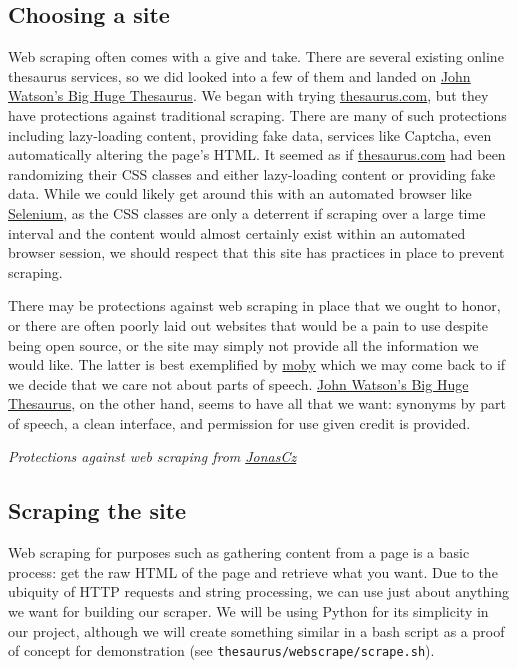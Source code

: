 \documentclass[11pt, twoside, reqno]{book}
\begin{document}
\subsection{Choosing a site}

Web scraping often comes with a give and take. There are several existing online thesaurus services, so we did looked into a few of them and landed on \href{https://words.bighugelabs.com}{John Watson's Big Huge Thesaurus}. We began with trying \href{https://www.thesaurus.com}{thesaurus.com}, but they have protections against traditional scraping. There are many of such protections including lazy-loading content, providing fake data, services like Captcha, even automatically altering the page's HTML. It seemed as if \href{https://www.thesaurus.com}{thesaurus.com} had been randomizing their CSS classes and either lazy-loading content or providing fake data. While we could likely get around this with an automated browser like \href{https://www.seleniumhq.org/}{Selenium}, as the CSS classes are only a deterrent if scraping over a large time interval and the content would almost certainly exist within an automated browser session, we should respect that this site has practices in place to prevent scraping.

There may be protections against web scraping in place that we ought to honor, or there are often poorly laid out websites that would be a pain to use despite being open source, or the site may simply not provide all the information we would like. The latter is best exemplified by \href{http://moby-thesaurus.org}{moby} which we may come back to if we decide that we care not about parts of speech. \href{https://words.bighugelabs.com}{John Watson's Big Huge Thesaurus}, on the other hand, seems to have all that we want: synonyms by part of speech, a clean interface, and permission for use given credit is provided.

\textit{Protections against web scraping from \href{https://github.com/JonasCz/How-To-Prevent-Scraping/blob/master/README.md}{JonasCz}}

\subsection{Scraping the site}

Web scraping for purposes such as gathering content from a page is a basic process: get the raw HTML of the page and retrieve what you want. Due to the ubiquity of HTTP requests and string processing, we can use just about anything we want for building our scraper. We will be using Python for its simplicity in our project, although we will create something similar in a bash script as a proof of concept for demonstration (see \texttt{thesaurus/webscrape/scrape.sh}).
\end{document}
